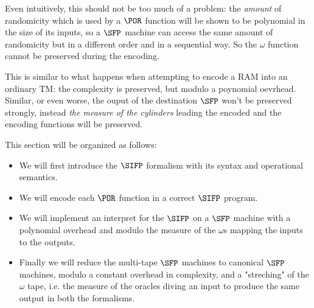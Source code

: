 Even intuitively, this should not be too much of a problem: the \emph{amount} of randomicity which is used by a $\POR$ function will be shown to be polynomial in the size of its inputs, so a $\SFP$ machine can access the same amount of randomicity but in a different order and in a sequential way. So the $\omega$ function cannot be preserved during the encoding.

This is similar to what happens when attempting to encode a RAM into an ordinary TM: the complexity is preserved, but modulo a poynomial oevrhead. Similar, or even worse, the ouput of the destination $\SFP$ won't be preserved strongly, instead \emph{the measure of the cylinders} leading the encoded and the encoding functions will be preserved.


This section will be organized as follows:

\begin{itemize}
\item We will first introduce the $\SIFP$ formalism with its syntax and operational semantics.
\item We will encode each $\POR$ function in a correct $\SIFP$ program.
\item We will implement an interpret for the $\SIFP$ on a $\SFP$ machine with a polynomial overhead and modulo the measure of the $\omega$s mapping the inputs to the outputs.
\item Finally we will reduce the multi-tape $\SFP$ machines to canonical $\SFP$ machines, modulo a constant overhead in complexity, and a "streching" of the $\omega$ tape, i.e. the measure of the oracles diving an input to produce the same output in both the formalisms.
\end{itemize}

